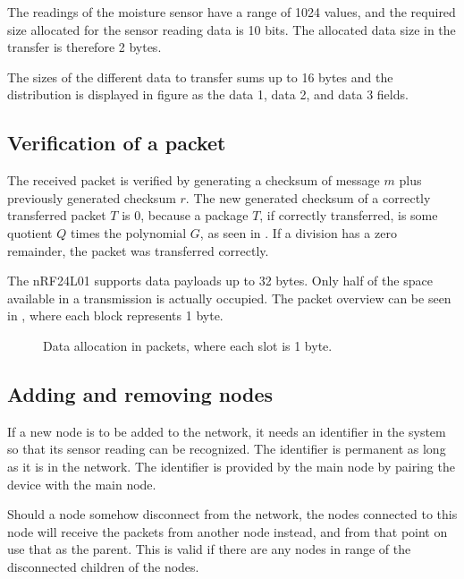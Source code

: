 The readings of the moisture sensor have a range of 1024 values, and the required size allocated for the sensor reading data is 10 bits. The allocated data size in the transfer is therefore 2 bytes.

The sizes of the different data to transfer sums up to 16 bytes and the distribution is displayed in figure  as the data 1, data 2, and data 3 fields.

\subsection{Verification of a packet}
The received packet is verified by generating a checksum of message $m$ plus previously generated checksum $r$.
The new generated checksum of a correctly transferred packet $T$ is 0, because a package $T$, if correctly transferred, is some quotient $Q$ times the polynomial $G$, as seen in . If a division has a zero remainder, the packet was transferred correctly.


The nRF24L01 supports data payloads up to 32 bytes. Only half of the space available in a transmission is actually occupied. The packet overview can be seen in , where each block represents 1 byte.
\begin{figure}[h!]
	\centering
	\caption{Data allocation in packets, where each slot is 1 byte.}
	\label{fig:dataalloc}
\end{figure}

\subsection{Adding and removing nodes}
If a new node is to be added to the network, it needs an identifier in the system so that its sensor reading can be recognized. The identifier is permanent as long as it is in the network.
The identifier is provided by the main node by pairing the device with the main node. 

Should a node somehow disconnect from the network, the nodes connected to this node will receive the packets from another node instead, and from that point on use that as the parent. This is valid if there are any nodes in range of the disconnected children of the nodes. 
